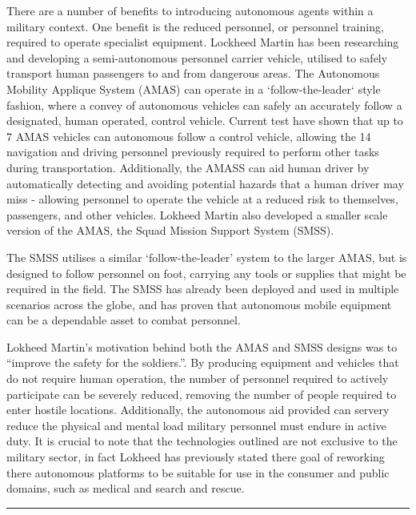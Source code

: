 There are a number of benefits to introducing autonomous agents within a military context.
One benefit is the reduced personnel, or personnel training, required to
operate specialist equipment.  
Lockheed Martin has been researching and developing a semi-autonomous
personnel carrier vehicle, utilised to safely transport human passengers to
and from dangerous areas.
The Autonomous Mobility Applique System (AMAS) can operate in a
`follow-the-leader` style fashion, where a convey of autonomous vehicles can
safely an accurately follow a designated, human operated, control vehicle.
Current test have shown that up to 7 AMAS vehicles can autonomous follow a
control vehicle, allowing the 14 navigation and driving personnel previously
required to perform other tasks during transportation.
Additionally, the AMASS can aid human driver by automatically detecting and
avoiding potential hazards that a human driver may miss - allowing personnel to operate
the vehicle at a reduced risk to themselves, passengers, and other vehicles.
Lokheed Martin also developed a smaller scale version of the AMAS, the Squad Mission
Support System (SMSS).

The SMSS utilises a similar `follow-the-leader' system to the larger AMAS, but
is designed to follow personnel on foot, carrying any tools or supplies that
might be required in the field.
The SMSS has already been deployed and used in multiple scenarios across the
globe, and has proven that autonomous mobile equipment can be a dependable
asset to combat personnel.

Lokheed Martin's motivation behind both the AMAS and SMSS designs was to
``improve the safety for the soldiers.''.
By producing equipment and vehicles that do not require human operation, the
number of personnel required to actively participate can be severely reduced,
removing the number of people required to enter hostile locations.
Additionally, the autonomous aid provided can servery reduce the physical and
mental load military personnel must endure in active duty.
It is crucial to note that the technologies outlined are not exclusive to
the military sector, in fact Lokheed has previously stated there goal of
reworking there autonomous platforms to be suitable for use in the consumer and
public domains, such as medical and search and rescue.

\noindent\rule{\textwidth}{1pt}
